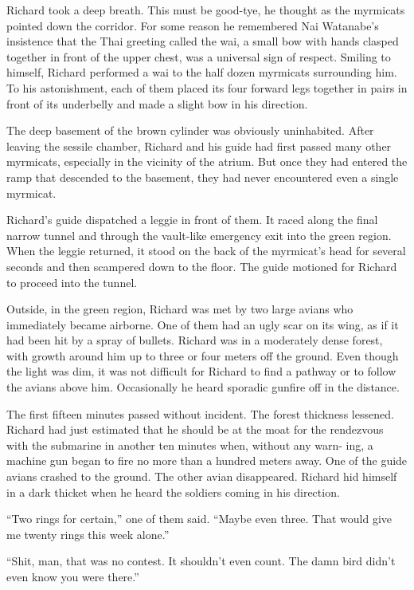 \documentclass[]{article}
\begin{document}
{{Richard took a deep breath.  This must be good-tye, he thought as the myrmicats pointed down the corridor.  For some reason he remembered Nai Watanabe’s insistence that the Thai greeting called the wai, a small bow with hands clasped together in front of the upper chest, was a universal sign of respect.  Smiling to himself, Richard performed a wai to the half dozen myrmicats surrounding him.  To his astonishment, each of them placed its four forward legs together in pairs in front of its underbelly and made a slight bow in his direction.

The deep basement of the brown cylinder was obviously uninhabited.  After leaving the sessile chamber, Richard and his guide had first passed many other myrmicats, especially in the vicinity of the atrium.  But once they had entered the ramp that descended to the basement, they had never encountered even a single myrmicat.

Richard’s guide dispatched a leggie in front of them.  It raced along the final narrow tunnel and through the vault-like emergency exit into the green region.  When the leggie returned, it stood on the back of the myrmicat’s head for several seconds and then scampered down to the floor.  The guide motioned for Richard to proceed into the tunnel.

Outside, in the green region, Richard was met by two large avians who immediately became airborne.  One of them had an ugly scar on its wing, as if it had been hit by a spray of bullets.  Richard was in a moderately dense forest, with growth around him up to three or four meters off the ground.  Even though the light was dim, it was not difficult for Richard to find a pathway or to follow the avians above him.  Occasionally he heard sporadic gunfire off in the distance.

The first fifteen minutes passed without incident.  The forest thickness lessened.  Richard had just estimated that he should be at the moat for the rendezvous with the submarine in another ten minutes when, without any warn- ing, a machine gun began to fire no more than a hundred meters away.  One of the guide avians crashed to the ground.  The other avian disappeared.  Richard hid himself in a dark thicket when he heard the soldiers coming in his direction.

“Two rings for certain,” one of them said.  “Maybe even three.  That would give me twenty rings this week alone.”

“Shit, man, that was no contest.  It shouldn’t even count.  The damn bird didn’t even know you were there.”

}}
\end{document}
